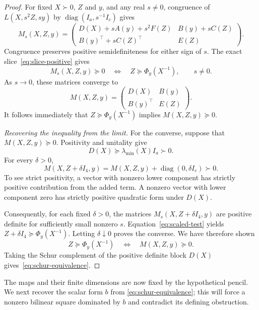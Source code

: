 \begin{proof}
For fixed $X\succ0$, $Z$ and $y$, and any real $s\ne0$, congruence
of $L(X,s^2Z,sy)$ by $\operatorname{diag}(I_a,s^{-1}I_c)$ gives
\begin{equation}\label{eq:scaled-pencil}
 M_s(X,Z,y)=
 \begin{pmatrix}
 D(X)+sA(y)+s^2F(Z)&B(y)+sC(Z)\\
 B(y)^\top+sC(Z)^\top&E(Z)
 \end{pmatrix}.
\end{equation}
Congruence preserves positive semidefiniteness for either sign of
$s$.  The exact slice~\eqref{eq:slice-positive} gives
\begin{equation}\label{eq:scaled-test}
 M_s(X,Z,y)\succeq0
 \quad\Longleftrightarrow\quad Z\succeq\Phi_y(X^{-1}),
 \qquad s\ne0.
\end{equation}
As $s\to0$, these matrices converge to
\[
 M(X,Z,y)=
 \begin{pmatrix}D(X)&B(y)\\B(y)^\top&E(Z)\end{pmatrix}.
\]
It follows immediately that $Z\succeq\Phi_y(X^{-1})$ implies
$M(X,Z,y)\succeq0$.

\emph{Recovering the inequality from the limit.}
For the converse, suppose that $M(X,Z,y)\succeq0$.  Positivity and
unitality give
\[
 D(X)\succeq\lambda_{\min}(X)I_a\succ0.
\]
For every $\delta>0$,
\[
 M(X,Z+\delta I_4,y)
 =M(X,Z,y)+\operatorname{diag}(0,\delta I_c)
 \succ0.
\]
To see strict positivity, a vector with nonzero lower component has
strictly positive contribution from the added term.  A nonzero
vector with lower component zero has strictly positive quadratic
form under $D(X)$.

Consequently, for each fixed $\delta>0$, the matrices
$M_s(X,Z+\delta I_4,y)$ are positive definite for sufficiently small
nonzero $s$.  Equation~\eqref{eq:scaled-test} yields
$Z+\delta I_4\succeq\Phi_y(X^{-1})$.  Letting $\delta\downarrow0$
proves the converse.  We have therefore shown
\[
 Z\succeq\Phi_y(X^{-1})
 \quad\Longleftrightarrow\quad M(X,Z,y)\succeq0.
\]
Taking the Schur complement of the positive definite block $D(X)$
gives~\eqref{eq:schur-equivalence}.
\end{proof}

The maps and their finite dimensions are now fixed by the
hypothetical pencil.  We next recover the scalar form $b$ from
\eqref{eq:schur-equivalence}; this will force a nonzero bilinear square
dominated by $b$ and contradict its defining obstruction.
